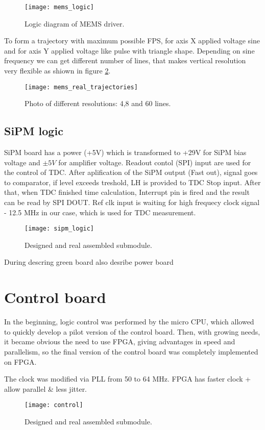 \begin{figure}[H]
\texttt{[image: mems\_logic]}
\caption{Logic diagram of MEMS driver.}
\label{fig:real_submodule}
\end{figure}


To form a trajectory with maximum possible FPS, for axis X applied voltage sine and for axis Y applied voltage like pulse with triangle shape. Depending on sine frequency we can get different number of lines, that makes vertical resolution very flexible as shiown in figure \ref{fig:mems_real_trajectories}.



\begin{figure}[H]
\texttt{[image: mems\_real\_trajectories]}
\caption{Photo of different resolutions: 4,8 and 60 lines.}
\label{fig:mems_real_trajectories}
\end{figure}





\subsection{SiPM logic}

SiPM board has a power (+5V) which is transformed to +29V for SiPM bias voltage and $\pm5 V$ for amplifier voltage. Readout contol (SPI) input are used for the control of TDC.
After aplification of the SiPM output (Fast out), signal goes to comparator, if level exceeds treshold, LH is provided to TDC Stop input.
After that, when TDC finished time calculation, Interrupt pin is fired and the result can be read by SPI DOUT.
Ref clk input is waiting for high frequecy clock signal - 12.5 MHz in our case, which is used for TDC measurement.



\begin{figure}[H]
\texttt{[image: sipm\_logic]}
\caption{Designed and real assembled submodule.}
\label{fig:real_submodule}
\end{figure}


During descring green board also desribe power board

\section{Control board}
In the beginning, logic control was performed by the micro CPU, which allowed to quickly develop a pilot version of the control board. Then, with growing needs, it became obvious the need to use FPGA, giving advantages in speed and parallelism, so the final version of the control board was completely implemented on FPGA.

The clock was modified via PLL from 50 to 64 MHz.
FPGA has faster clock + allow parallel \& less jitter.

\begin{figure}[H]
\texttt{[image: control]}
\caption{Designed and real assembled submodule.}
\label{fig:real_submodule}
\end{figure}
